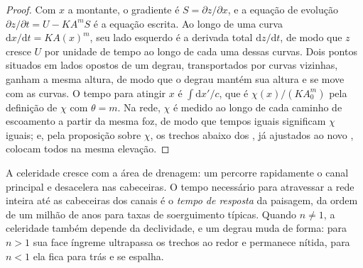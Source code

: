 \begin{proof}
Com $x$ a montante, o gradiente é $S = \partial z/\partial x$, e a equação de
evolução $\partial z/\partial t = U - K A^m S$ é a equação escrita. Ao longo de uma curva
$\mathrm{d}x/\mathrm{d}t = K A(x)^m$, seu lado esquerdo é a derivada total
$\mathrm{d}z/\mathrm{d}t$, de modo que $z$ cresce $U$ por unidade de tempo ao longo de cada uma
dessas curvas. Dois pontos situados em lados opostos de um degrau, transportados
por curvas vizinhas, ganham a mesma altura, de modo que o degrau mantém sua altura
e se move com as curvas. O tempo para atingir $x$ é
$\int \mathrm{d}x'/c$, que é $\chi(x)/(K A_0^m)$ pela definição de
$\chi$ com $\theta = m$. Na rede, $\chi$ é medido ao longo de cada caminho de
escoamento a partir da mesma foz, de modo que tempos iguais significam $\chi$ iguais; e, pela
proposição sobre $\chi$, os trechos abaixo dos , já ajustados ao novo
, colocam todos na mesma elevação.
\end{proof}

A celeridade cresce com a área de drenagem: um  percorre rapidamente o
canal principal e desacelera nas cabeceiras. O tempo necessário para atravessar
a rede inteira até as cabeceiras dos canais é o \emph{tempo de resposta} da paisagem,
da ordem de um milhão de anos para taxas de soerguimento típicas. Quando $n \ne 1$,
a celeridade também depende da declividade, e um degrau muda de forma: para $n >
1$ sua face íngreme ultrapassa os trechos ao redor e permanece nítida, para $n <
1$ ela fica para trás e se espalha.

